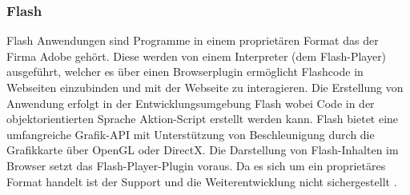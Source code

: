 \subsubsection{Flash}
\label{sec:Flash}
Flash Anwendungen sind Programme in einem proprietären Format das der Firma Adobe gehört.
Diese werden von einem Interpreter (dem Flash-Player) ausgeführt, welcher es über einen Browserplugin ermöglicht Flashcode in Webseiten einzubinden und mit der Webseite zu interagieren.
%
Die Erstellung von Anwendung erfolgt in der Entwicklungsumgebung Flash wobei Code in der objektorientierten Sprache Aktion-Script erstellt werden kann.
Flash bietet eine umfangreiche Grafik-API mit Unterstützung von Beschleunigung durch die Grafikkarte über OpenGL oder DirectX.
%
Die Darstellung von Flash-Inhalten im Browser setzt das Flash-Player-Plugin voraus.
Da es sich um ein proprietäres Format handelt ist der Support und die Weiterentwicklung nicht sichergestellt \cite{flash-14}.
